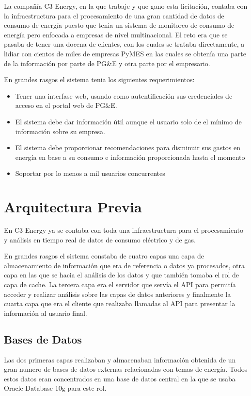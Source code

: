 \documentclass{book}
\begin{document}
La compañía C3 Energy, en la que trabaje y que gano esta licitación,
contaba con la infraestructura para el procesamiento de una gran
cantidad de datos de consumo de energía puesto que tenia un sistema
de monitoreo de consumo de energía pero enfocada a empresas de nivel
multinacional. El reto era que se pasaba de tener una docena
de clientes, con los cuales se trataba directamente, a lidiar con
cientos de miles de empresas PyMES en las cuales se obtenía una
parte de la información por parte de PG\&E y otra parte por el
empresario.

En grandes rasgos el sistema tenia los siguientes requerimientos:
\begin{itemize}
\item Tener una interfase web, usando como autentificación
  sus credenciales de acceso en el portal web de PG\&E.
\item El sistema debe dar información útil aunque el usuario solo de
  el mínimo de información sobre su empresa.
\item El sistema debe proporcionar recomendaciones para disminuir sus
  gastos en energía en base a su consumo e información proporcionada
  hasta el momento
\item Soportar por lo menos a mil usuarios concurrentes
\end{itemize}

\section{Arquitectura Previa}
En C3 Energy ya se contaba con toda una infraestructura para el
procesamiento y análisis en tiempo real de datos de consumo eléctrico
y de gas.

En grandes rasgos el sistema constaba de cuatro capas una capa de
almacenamiento de información que era de referencia o datos ya
procesados, otra capa en las que se hacia el análisis de los datos
y que también tomaba el rol de capa de cache. La tercera capa era el
servidor que servía el API para permitía acceder y realizar análisis
sobre las capas de datos anteriores y finalmente la cuarta capa que
era el cliente que realizaba llamadas al API para presentar la
información al usuario final.

\subsection{Bases de Datos}
Las dos primeras capas realizaban y almacenaban información obtenida
de un gran numero de bases de datos externas relacionadas con temas
de energía. Todos estos datos eran concentrados en una base de datos
central en la que se usaba Oracle Database 10g para este rol.
\end{document}
